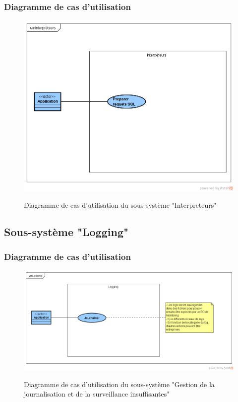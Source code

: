 \subsubsection{Diagramme de cas d'utilisation}
\begin{figure}[H]
	\centering
	\begin{minipage}{12cm}
		\centering
		{\includegraphics[height=0.3\textheight, width=1\textwidth]{fig/Interpreteurs-use-case-diagram.png}}
	\end{minipage}
	\caption{Diagramme de cas d'utilisation du sous-système "Interpreteurs"}
	\label{fig:7.18}
\end{figure}


\subsection{Sous-système "Logging"}
\subsubsection{Diagramme de cas d'utilisation}
\begin{figure}[H]
	\centering
	\begin{minipage}{12cm}
		\centering
		{\includegraphics[height=0.35\textheight, width=1\textwidth]{fig/Logging-use-case-diagram.png}}
	\end{minipage}
	\caption{Diagramme de cas d'utilisation du sous-système "Gestion de la journalisation et de la surveillance insuffisantes"}
	\label{fig:7.19}
\end{figure}

